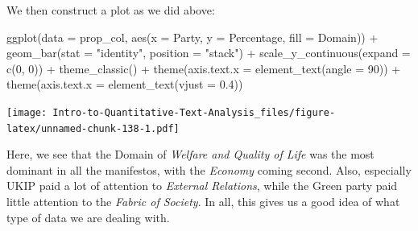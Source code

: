 \documentclass[
]{article}
\newenvironment{Shaded}{\begin{snugshade}}{\end{snugshade}}
\newcommand{\AttributeTok}[1]{\textcolor[rgb]{0.77,0.63,0.00}{#1}}
\newcommand{\DecValTok}[1]{\textcolor[rgb]{0.00,0.00,0.81}{#1}}
\newcommand{\FloatTok}[1]{\textcolor[rgb]{0.00,0.00,0.81}{#1}}
\newcommand{\FunctionTok}[1]{\textcolor[rgb]{0.00,0.00,0.00}{#1}}
\newcommand{\NormalTok}[1]{#1}
\newcommand{\OtherTok}[1]{\textcolor[rgb]{0.56,0.35,0.01}{#1}}
\newcommand{\SpecialCharTok}[1]{\textcolor[rgb]{0.00,0.00,0.00}{#1}}
\newcommand{\StringTok}[1]{\textcolor[rgb]{0.31,0.60,0.02}{#1}}
\begin{document}
\begin{Shaded}
\end{Shaded}

We then construct a plot as we did above:

\begin{Shaded}
\begin{Highlighting}[]
\FunctionTok{ggplot}\NormalTok{(}\AttributeTok{data =}\NormalTok{ prop\_col, }\FunctionTok{aes}\NormalTok{(}\AttributeTok{x =}\NormalTok{ Party, }\AttributeTok{y =}\NormalTok{ Percentage, }\AttributeTok{fill =}\NormalTok{ Domain)) }\SpecialCharTok{+}
    \FunctionTok{geom\_bar}\NormalTok{(}\AttributeTok{stat =} \StringTok{"identity"}\NormalTok{, }\AttributeTok{position =} \StringTok{"stack"}\NormalTok{) }\SpecialCharTok{+} \FunctionTok{scale\_y\_continuous}\NormalTok{(}\AttributeTok{expand =} \FunctionTok{c}\NormalTok{(}\DecValTok{0}\NormalTok{,}
    \DecValTok{0}\NormalTok{)) }\SpecialCharTok{+} \FunctionTok{theme\_classic}\NormalTok{() }\SpecialCharTok{+} \FunctionTok{theme}\NormalTok{(}\AttributeTok{axis.text.x =} \FunctionTok{element\_text}\NormalTok{(}\AttributeTok{angle =} \DecValTok{90}\NormalTok{)) }\SpecialCharTok{+}
    \FunctionTok{theme}\NormalTok{(}\AttributeTok{axis.text.x =} \FunctionTok{element\_text}\NormalTok{(}\AttributeTok{vjust =} \FloatTok{0.4}\NormalTok{))}
\end{Highlighting}
\end{Shaded}

\texttt{[image: Intro-to-Quantitative-Text-Analysis\_files/figure-latex/unnamed-chunk-138-1.pdf]}

Here, we see that the Domain of \emph{Welfare and Quality of Life} was the most dominant in all the manifestos, with the \emph{Economy} coming second. Also, especially UKIP paid a lot of attention to \emph{External Relations}, while the Green party paid little attention to the \emph{Fabric of Society}. In all, this gives us a good idea of what type of data we are dealing with.
\end{document}
